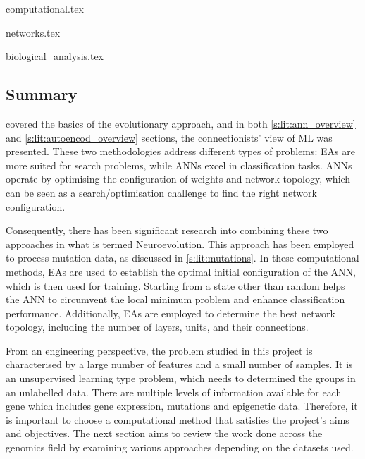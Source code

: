 


{computational.tex}

{networks.tex}

{biological_analysis.tex}



\subsection{Summary} \label{s:lit:choosing_ml}

 covered the basics of the evolutionary approach, and in both \ref{s:lit:ann_overview} and \ref{s:lit:autoencod_overview} sections, the connectionists' view of ML was presented. These two methodologies address different types of problems: EAs are more suited for search problems, while ANNs excel in classification tasks. ANNs operate by optimising the configuration of weights and network topology, which can be seen as a search/optimisation challenge to find the right network configuration. 

Consequently, there has been significant research into combining these two approaches in what is termed Neuroevolution. This approach has been employed to process mutation data, as discussed in \cref{s:lit:mutations}. In these computational methods, EAs are used to establish the optimal initial configuration of the ANN, which is then used for training. Starting from a state other than random helps the ANN to circumvent the local minimum problem and enhance classification performance. Additionally, EAs are employed to determine the best network topology, including the number of layers, units, and their connections.

From an engineering perspective, the problem studied in this project is characterised by a large number of features and a small number of samples. It is an unsupervised learning type problem, which needs to determined the groups in an unlabelled data. There are multiple levels of information available for each gene which includes gene expression, mutations and epigenetic data. Therefore, it is important to choose a computational method that satisfies the project's aims and objectives. The next section aims to review the work done across the genomics field by examining various approaches depending on the datasets used.

